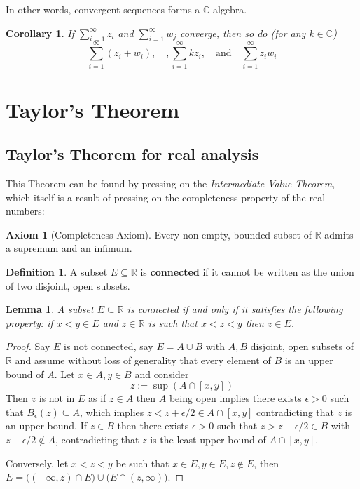 \documentclass[12pt]{article}
\theoremstyle{plain}
\newtheorem{lemma}[thm]{Lemma}
\newtheorem{cor}[thm]{Corollary}
\theoremstyle{definition}
\newtheorem{defn}[thm]{Definition} %
\newtheorem{axiom}[thm]{Axiom}
\newcommand{\bb}[1]{\mathbb{#1}}
\begin{document}
In other words, convergent sequences forms a $\bb{C}$-algebra.
\begin{cor}\label{cor:sum_convergen_sums}
If $\sum_{i = 1}^\infty z_i$ and $\sum_{i = 1}^\infty w_j$ converge, then so do (for any $k \in \bb{C}$)
\begin{equation}
\sum_{i = 1}^\infty (z_i + w_i),\quad,\sum_{i = 1}^\infty kz_i,\quad \text{and}\quad \sum_{i = 1}^\infty z_iw_i
\end{equation}
\end{cor}


\section{Taylor's Theorem}
\subsection{Taylor's Theorem for real analysis}
This Theorem can be found by pressing on the \emph{Intermediate Value Theorem}, which itself is a result of pressing on the completeness property of the real numbers:
\begin{axiom}[Completeness Axiom]
Every non-empty, bounded subset of $\bb{R}$ admits a supremum and an infimum.
\end{axiom}
\begin{defn}
A subset $E \subseteq \bb{R}$ is \textbf{connected} if it cannot be written as the union of two disjoint, open subsets.
\end{defn}
\begin{lemma}
\label{lem:connectedness}
A subset $E \subseteq \bb{R}$ is connected if and only if it satisfies the following property: if $x < y \in E$ and $z \in \bb{R}$ is such that $x < z < y$ then $z \in E$.
\end{lemma}
\begin{proof}
Say $E$ is not connected, say $E = A \cup B$ with $A,B$ disjoint, open subsets of $\bb{R}$ and assume without loss of generality that every element of $B$ is an upper bound of $A$. Let $x \in A, y \in B$ and consider
\[z := \sup (A \cap [x,y])\]
Then $z$ is not in $E$ as if $z \in A$ then $A$ being open implies there exists $\epsilon > 0$ such that $B_\epsilon(z) \subseteq A$, which implies $z < z + \epsilon/2 \in A \cap [x,y]$ contradicting that $z$ is an upper bound. If $z \in B$ then there exists $\epsilon > 0$ such that $z > z - \epsilon/2 \in B$ with $z - \epsilon/2 \not\in A$, contradicting that $z$ is the least upper bound of $A \cap [x,y]$.

Conversely, let $x < z < y$ be such that $x \in E, y \in E, z \not\in E$, then $E = \big((-\infty, z) \cap E\big) \cup \big(E \cap (z,\infty)\big)$.
\end{proof}
\end{document}
